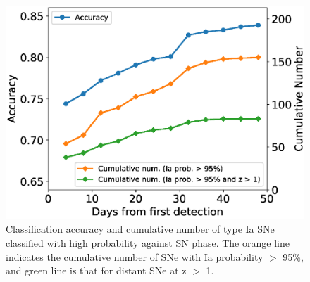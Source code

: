 \documentclass[proof]{pasj01}
\begin{document}
\begin{figure}[htbp]
  \begin{center}
     \includegraphics[width=\columnwidth]{figures/n_observations_SNphase_v200318.eps}
  \end{center}
  \caption{%
  Classification accuracy and cumulative number of type Ia SNe classified with high probability against SN phase.
  The orange line indicates the cumulative number of SNe with Ia probability $>$ 95\%, and green line is that for distant SNe at z $>$ 1. %
  }%
  \label{fig:n_observations_SNphase}
\end{figure}
%
\end{document}
